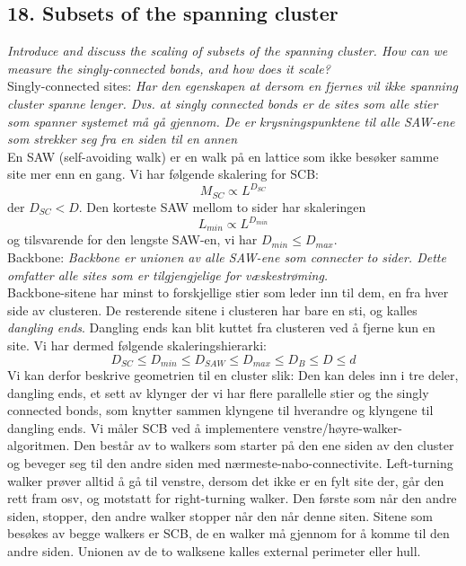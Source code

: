 \documentclass[english, a4paper]{article}
\begin{document}
\subsection{ 18. Subsets of the spanning cluster}
\textit{Introduce and discuss the scaling of subsets of the spanning cluster.
How can we measure the singly-connected bonds, and how does it scale?} \\

\noindent
Singly-connected sites:
\indent \textit{Har den egenskapen at dersom en fjernes vil ikke spanning cluster spanne lenger. 
Dvs. at singly connected bonds er de sites som alle stier som spanner systemet må gå gjennom. 
De er krysningspunktene til alle SAW-ene som strekker seg fra en siden til en annen }\\

En SAW (self-avoiding walk) er en walk på en lattice som ikke besøker samme site mer enn en gang. 
Vi har følgende skalering for SCB:
\begin{equation}
 M_{SC} \propto L^{D_{SC}}
\end{equation}
der $D_{SC} < D$. Den korteste SAW mellom to sider har skaleringen
\begin{equation}
 L_{min} \propto L^{D_{min}}
\end{equation}
og tilsvarende for den lengste SAW-en, vi har $D_{min} \leq D_{max}$. \\
\noindent Backbone:
\indent \textit{Backbone er unionen av alle SAW-ene som connecter to sider. Dette omfatter
alle sites som er tilgjengjelige for væskestrøming.}\\
Backbone-sitene har minst to forskjellige stier som leder inn til dem, en fra hver side av clusteren. 
De resterende sitene i clusteren har bare en sti, og kalles \textit{dangling ends}. Dangling ends kan 
blit kuttet fra clusteren ved å fjerne kun en site. Vi har dermed følgende skaleringshierarki:
\begin{equation}
 D_{SC} \leq D_{min} \leq D_{SAW} \leq D_{max} \leq D_B \leq D \leq d
\end{equation}
Vi kan derfor beskrive geometrien til en cluster slik: Den kan deles inn i tre deler,
dangling ends, et sett av klynger der vi har flere parallelle stier og the singly connected bonds,
som knytter sammen klyngene til hverandre og klyngene til dangling ends. Vi måler SCB ved å 
implementere venstre/høyre-walker-algoritmen. Den består av to walkers som starter på den ene siden av
den cluster og beveger seg til den andre siden med nærmeste-nabo-connectivite. Left-turning walker prøver alltid
å gå til venstre, dersom det ikke er en fylt site der, går den rett fram osv, og motstatt for right-turning walker. 
Den første som når den andre siden, stopper, den andre walker stopper når den når denne siten. 
Sitene som besøkes av begge walkers er SCB, de en walker må gjennom for å komme til den andre siden. Unionen
av de to walksene kalles external perimeter eller hull. \\
\end{document}
